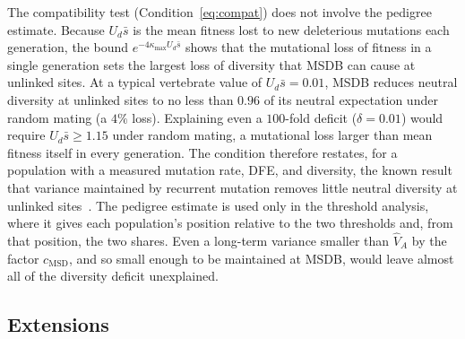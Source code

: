 \documentclass{article}
\begin{document}
The compatibility test (Condition~\eqref{eq:compat}) does not involve the pedigree estimate. Because $U_d\bar{s}$ is the mean fitness lost to new deleterious mutations each generation, the bound $e^{-4\kappa_\text{max}U_d\bar{s}}$ shows that the mutational loss of fitness in a single generation sets the largest loss of diversity that MSDB can cause at unlinked sites. At a typical vertebrate value of $U_d\bar{s} = 0.01$, MSDB reduces neutral diversity at unlinked sites to no less than $0.96$ of its neutral expectation under random mating (a $4\%$ loss). Explaining even a $100$-fold deficit ($\delta = 0.01$) would require $U_d\bar{s} \ge 1.15$ under random mating, a mutational loss larger than mean fitness itself in every generation. The condition therefore restates, for a population with a measured mutation rate, DFE, and diversity, the known result that variance maintained by recurrent mutation removes little neutral diversity at unlinked sites~\cite{charlesworth2012}. The pedigree estimate is used only in the threshold analysis, where it gives each population's position relative to the two thresholds and, from that position, the two shares. Even a long-term variance smaller than $\hat{V}_A$ by the factor $c_\text{MSD}$, and so small enough to be maintained at MSDB, would leave almost all of the diversity deficit unexplained.

\subsection{Extensions}\label{sec:extensions}
\end{document}
